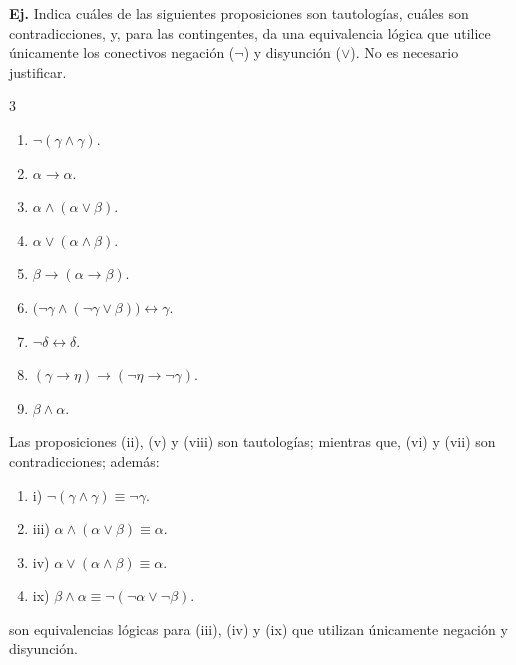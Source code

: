 \documentclass[letterpaper,DIV=14,headsepline,12pt]{scrartcl}
\makeatletter
\newcounter{Ejer}
\newcommand{\pts}{}
\newenvironment{ejercicio}[1]{\noindent
    \ifthenelse{\equal{#1}{1} \OR \equal{#1}{+1}}{\renewcommand{\pts}{\textbf{(#1 pt)}}}{\renewcommand{\pts}{\textbf{(#1 pts)}}}\textbf{Ej. \theEjer} \pts\stepcounter{Ejer}}{\vspace{.3cm}}
\newenvironment{solu}[1][]{%
        \par\pushQED{\hfill \lozenge}%
        \normalfont\topsep6pt \partopsep0pt %
        \trivlist
        \item[\hskip\labelsep
                \textbf{\textit{Solución.}}%
        ]#1
        }{%
        \popQED\endtrivlist\@endpefalse
    }
\makeatother
\begin{document}
    \begin{ejercicio}{1}
        Indica cuáles de las siguientes proposiciones son tautologías, cuáles son contradicciones, y, para las contingentes, da una equivalencia lógica que utilice únicamente los conectivos negación ($\lnot$) y disyunción ($\lor$). No es necesario justificar.
        \begin{multicols}{3}
            \begin{enumerate}
                \item $\lnot (\gamma \land \gamma)$.
                \item $\alpha \to \alpha$.
                \item $\alpha \land (\alpha \lor \beta)$.
                \item $\alpha \lor (\alpha \land \beta)$.
                \item $\beta \to (\alpha \to \beta)$.
                \item $\big( \lnot \gamma \land (\lnot \gamma \lor \beta) \big) \leftrightarrow \gamma$.
                \item $\lnot \delta \leftrightarrow \delta$.
                \item $(\gamma \to \eta) \to (\lnot \eta \to \lnot \gamma)$.
                \item $\beta \land \alpha$.
            \end{enumerate}
        \end{multicols}
    \end{ejercicio}
    \begin{solu}
        Las proposiciones (ii), (v) y (viii) son tautologías; mientras que, (vi) y (vii) son contradicciones; además:
        \begin{enumerate}[\hspace{1.5cm}]
            \item i) $\lnot (\gamma \land \gamma) \equiv \lnot \gamma$.
            \item iii) $\alpha \land (\alpha \lor \beta) \equiv \alpha$.
            \item iv) $\alpha \lor (\alpha \land \beta) \equiv \alpha$.
            \item ix) $\beta \land \alpha \equiv \lnot ( \lnot \alpha \lor \lnot \beta )$.
        \end{enumerate}
        son equivalencias lógicas para (iii), (iv) y (ix) que utilizan únicamente negación y disyunción.
    \end{solu}
\end{document}
